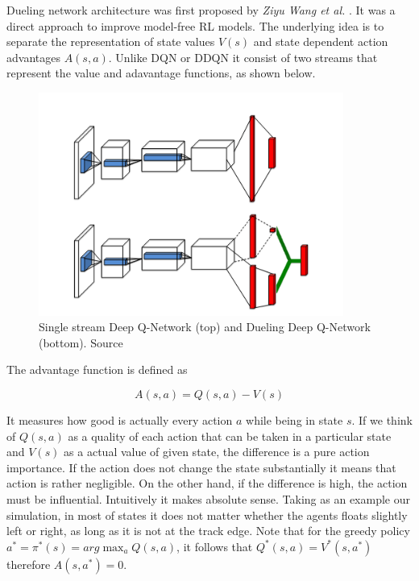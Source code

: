 Dueling network architecture was first proposed by \emph{Ziyu Wang  et al.} \cite{DBLP:journals/corr/WangFL15}. It was a direct approach to 
improve model-free RL models. The underlying idea is to separate the representation of state values $V(s)$ and state dependent action 
advantages $A(s, a)$. Unlike DQN or DDQN it consist of two streams that represent the value and adavantage functions, as shown below.

\begin{figure}[h]
    \centering
    \includegraphics[width=10cm]{img/dueling_vs_single_qn.png}
    \caption{Single stream Deep Q-Network (top) and Dueling Deep Q-Network (bottom). Source \cite{DBLP:journals/corr/WangFL15}}
    \label{fig:single-vs-dueling-q-network}
\end{figure}

The advantage function is defined as

\begin{equation}
    A(s, a) = Q(s, a) - V(s)
\label{eq:advantage}
\end{equation}

It measures how good is actually every action $a$ while being in state $s$. If we think of $Q(s, a)$ as a quality of each action that can be
taken in a particular state and $V(s)$ as a actual value of given state, the difference is a pure action importance. If the action does not 
change the state substantially it means that action is rather negligible. On the other hand, if the difference is high, the action must be
influential. Intuitively it makes absolute sense. Taking as an example our simulation, in most of states it does not matter whether the agents floats slightly left or right, as long as it is not at the track edge. Note that for the greedy policy $a^* = \pi^*(s) = arg\max_aQ(s, a)$, it follows that $Q^*(s, a) = V^*(s, a^*)$ therefore $A(s, a^*) = 0$.

